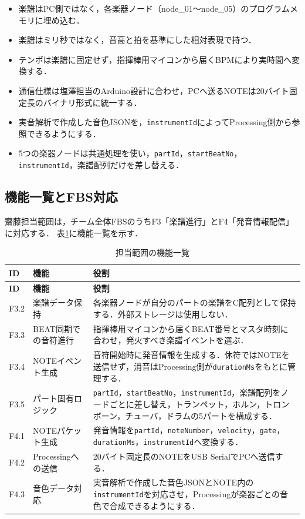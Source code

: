 \documentclass[uplatex,dvipdfmx]{jlreq}
\newcommand{\code}[1]{\texttt{#1}}
\begin{document}
\begin{itemize}
  \item 楽譜はPC側ではなく，各楽器ノード（node\_01〜node\_05）のプログラムメモリに埋め込む．
  \item 楽譜はミリ秒ではなく，音高と拍を基準にした相対表現で持つ．
  \item テンポは楽譜に固定せず，指揮棒用マイコンから届くBPMにより実時間へ変換する．
  \item 通信仕様は塩澤担当のArduino設計に合わせ，PCへ送るNOTEは20バイト固定長のバイナリ形式に統一する．
  \item 実音解析で作成した音色JSONを，\code{instrumentId}によってProcessing側から参照できるようにする．
  \item 5つの楽器ノードは共通処理を使い，\code{partId}，\code{startBeatNo}，\code{instrumentId}，楽譜配列だけを差し替える．
\end{itemize}

\subsection{機能一覧とFBS対応}

齋藤担当範囲は，チーム全体FBSのうちF3「楽譜進行」とF4「発音情報配信」に対応する．
表\ref{tab:saito-functions}に機能一覧を示す．

\begin{longtable}{p{}p{}p{}}
\caption{担当範囲の機能一覧}\label{tab:saito-functions}\\
\toprule
\textbf{ID} & \textbf{機能} & \textbf{役割} \\
\midrule
\endfirsthead
\toprule
\textbf{ID} & \textbf{機能} & \textbf{役割} \\
\midrule
\endhead
F3.2 & 楽譜データ保持 &
各楽器ノードが自分のパートの楽譜をC配列として保持する．外部ストレージは使用しない．\\
F3.3 & BEAT同期での音符進行 &
指揮棒用マイコンから届くBEAT番号とマスタ時刻に合わせ，発火すべき楽譜イベントを選ぶ．\\
F3.4 & NOTEイベント生成 &
音符開始時に発音情報を生成する．休符ではNOTEを送信せず，消音はProcessing側が\code{durationMs}をもとに管理する．\\
F3.5 & パート固有ロジック &
\code{partId}，\code{startBeatNo}，\code{instrumentId}，楽譜配列をノードごとに差し替え，トランペット，ホルン，トロンボーン，チューバ，ドラムの5パートを構成する．\\
F4.1 & NOTEパケット生成 &
発音情報を\code{partId}，\code{noteNumber}，\code{velocity}，\code{gate}，
\code{durationMs}，\code{instrumentId}へ変換する．\\
F4.2 & Processingへの送信 &
20バイト固定長のNOTEをUSB SerialでPCへ送信する．\\
F4.3 & 音色データ対応 &
実音解析で作成した音色JSONとNOTE内の\code{instrumentId}を対応させ，Processingが楽器ごとの音色で合成できるようにする．\\
\bottomrule
\end{longtable}
\end{document}

